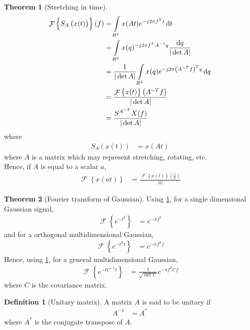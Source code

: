 \documentclass[titlepage, fleqn, a4paper, 12pt, twoside]{article}
\theoremstyle{definition}
\newtheorem{definition}{Definition}
\theoremstyle{theorem}
\newtheorem{theorem}{Theorem}
\DeclareMathOperator{\FT}{\mathcal{F}}
\begin{document}
\begin{theorem}[Stretching in time]
	\begin{align*}
		\FT\left\{ S_A\left( x(t) \right) \right\}(f) &= \int\limits_{R^d} x(A t) e^{-j 2 \pi f^T t} \dif t\\
		&= \int\limits_{R^d} x(q) ^{-j 2 \pi f^T A^{-1} q} \frac{\dif q}{|\det A|}\\
		&= \frac{1}{|\det A|} \int\limits_{R^d}  x(q) e^{-j 2 \pi \left( A^{-T} f \right)^T q} \dif q\\
		&= \frac{\FT\left\{ x(t) \right\}\left( A^{-T} f \right)}{|\det A|}\\
		&= \frac{S^{A^{-T}} X(f)}{|\det A|}
	\end{align*}
	where
	\begin{align*}
		S_A\left( x(t) \right) &= x(A t)
	\end{align*}
	where $A$ is a matrix which may represent stretching, rotating, etc.\\
	Hence, if $A$ is equal to a scalar $a$,
	\begin{align*}
		\FT\left\{ x(a t) \right\} &= \frac{\FT\left\{ x(t) \right\}\left( \frac{f}{a} \right)}{|a|}
	\end{align*}
	\label{thm:stretching_in_time}
\end{theorem}

\begin{theorem}[Fourier transform of Gaussian]
	Using \cref{thm:stretching_in_time}, for a single dimensional Gaussian signal,
	\begin{align*}
		\FT\left\{ e^{-t^2} \right\} &= e^{-\pi f^2}
	\end{align*}
	and for a orthogonal multidimensional Gaussian,
	\begin{align*}
		\FT\left\{ e^{-t^T t} \right\} &= e^{-\pi f^T f}
	\end{align*}
	Hence, using \cref{thm:stretching_in_time}, for a general multidimensional Gaussian,
	\begin{align*}
		\FT\left\{ e^{-t C^{-1} t} \right\} &= \frac{1}{\sqrt{\det C}} e^{-\pi f^T C f}
	\end{align*}
	where $C$ is the covariance matrix.
	\label{thm:Fourier_transform_of_Gaussian}
\end{theorem}

\begin{definition}[Unitary matrix]
	A matrix $A$ is said to be unitary if
	\begin{align*}
		A^{-1} &= A^*
	\end{align*}
	where $A^*$ is the conjugate transpose of $A$.
\end{definition}
\end{document}
